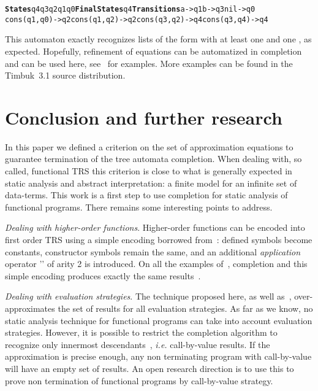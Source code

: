 \documentclass[a4paper,11pt]{llncs}
\newcommand{\timbuk}{{\sf Timbuk}}
\def\timFont{\bf}
\newcommand{\States}{{\timFont States}}
\newcommand{\FinalStates}{{\timFont Final States}}
\newcommand{\Transitions}{{\timFont Transitions}}
\def\arobase{\symbol{64}}
\theoremstyle{plain}
\begin{document}
{\footnotesize
\begin{alltt}
\States q4 q3 q2 q1 q0  \FinalStates q4  \Transitions a->q1  b->q3  nil->q0  
cons(q1,q0)->q2  cons(q1,q2)->q2  cons(q3,q2)->q4  cons(q3,q4)->q4
\end{alltt}  
}
 
\noindent
This automaton exactly recognizes lists of the form  with at
least one  and one , as expected. Hopefully, refinement of equations
can be automatized in completion~\cite{BoichutBGL-ICFEM12} and can be used here,
see~\cite{GenetS-rep13} for examples. More examples can be found in the
\timbuk~3.1 source distribution.


\section{Conclusion and further research}
\label{sec:further}

In this paper we defined a criterion on the set of approximation equations to
guarantee termination of the tree automata completion. When dealing with, so called,
functional TRS this criterion is close to what is generally expected in static
analysis and abstract interpretation: a finite model for an infinite
set of data-terms. This work is a first step to use
completion for static analysis of functional programs. There remains some
interesting points to address.

\medskip
\noindent
{\em Dealing with higher-order functions}. Higher-order
functions can be encoded into first order TRS using a simple encoding 
borrowed from~\cite{Jones-Book87}: defined symbols become constants, constructor
symbols remain the same, and an additional {\em application} operator '\arobase'
of arity 2 is introduced. On all the examples
of~\cite{OngR-POPL11}, 
completion and this simple encoding produces exactly the same
results~\cite{GenetS-rep13}. 

\medskip
\noindent
{\em Dealing with evaluation strategies}. The technique proposed here, as well
as~\cite{OngR-POPL11}, over-approximates the set of results for all evaluation
strategies. As far as we know, no static analysis technique for functional
programs can take into account evaluation strategies. 
However, it is possible to restrict the completion algorithm to
recognize only innermost descendants~\cite{GenetS-rep13}, {\em i.e.}
call-by-value results. If the approximation is precise enough, any non
terminating program with call-by-value will have an empty set of
results. An open research direction is to use this to prove non termination
of functional programs by call-by-value strategy.
\end{document}
